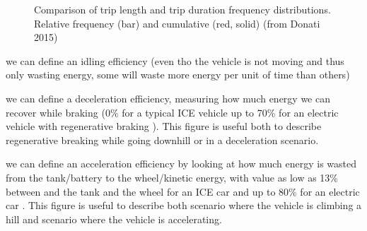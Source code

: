 \begin{figure}[h!]
    \centering
    \hfill
    \caption{Comparison of trip length and trip duration frequency distributions. Relative frequency (bar) and cumulative (red, solid) (from Donati 2015\cite{donati_individual_2015})}
    \label{fig:trips-comparison}
\end{figure}

we can define an idling efficiency (even tho the vehicle is not moving and thus only wasting energy, some will waste more energy per unit of time than others)

we can define a deceleration efficiency, measuring how much energy we can recover while braking (0\% for a typical ICE vehicle up to 70\% for an electric vehicle with regenerative braking \cite{noauthor_regenerative_nodate}). This figure is useful both to describe regenerative breaking while going downhill or in a deceleration scenario.

we can define an acceleration efficiency by looking at how much energy is wasted from the tank/battery to the wheel/kinetic energy, with value as low as 13\% between and the tank and the wheel for an ICE car and up to 80\% for an electric car \cite{lohse-busch_ambient_2013}. This figure is useful to describe both scenario where the vehicle is climbing a hill and scenario where the vehicle is accelerating.

